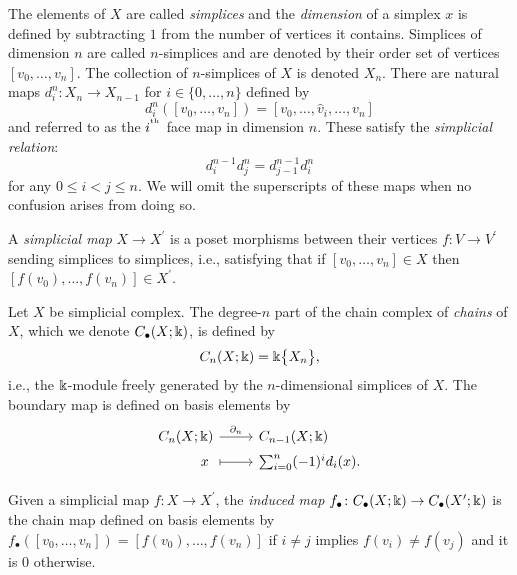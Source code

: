 The elements of $X$ are called \textit{simplices} and the \textit{dimension} of a simplex $x$ is defined by subtracting $1$ from the number of vertices it contains.
Simplices of dimension $n$ are called $n$-simplices and are denoted by their order set of vertices $[v_0, \dots, v_n]$.
The collection of $n$-simplices of $X$ is denoted $X_n$.
There are natural maps $d_i^n \colon X_n \to X_{n-1}$ for $i \in \{0, \dots, n\}$ defined by
\begin{equation*}
d_i^n([v_0, \dots, v_n]) = [v_0, \dots, \widehat{v}_i, \dots, v_n]
\end{equation*}
and referred to as the $i^{^\mathrm{th}}$ face map in dimension $n$.
These satisfy the \textit{simplicial relation}:
\begin{equation} \label{e:simplicial relation}
d_i^{n-1} d^n_j = d_{j-1}^{n-1} d_i^n
\end{equation}
for any $0 \leq i < j \leq n$.
We will omit the superscripts of these maps when no confusion arises from doing so.

A \textit{simplicial map} $X \to X^\prime$ is a poset morphisms between their vertices $f \colon V \to V^\prime$ sending simplices to simplices, i.e., satisfying that if $[v_0, \dots, v_n] \in X$ then $[f(v_0), \dots, f(v_n)] \in X^\prime$.

Let $X$ be simplicial complex.
The degree-$n$ part of the chain complex of \textit{chains} of $X$, which we denote $C_\bullet(X; \Bbbk)$, is defined by
\begin{equation*}
C_n(X; \Bbbk) = \Bbbk \big\{ X_n \big\},
\end{equation*}
i.e., the $\Bbbk$-module freely generated by the $n$-dimensional simplices of $X$.
The boundary map is defined on basis elements by
\begin{equation*}
\begin{tikzcd}[column sep=normal, row sep=tiny,row sep = 0ex
,/tikz/column 1/.append style={anchor=base east}
,/tikz/column 2/.append style={anchor=base west}
]
C_n(X; \k) \arrow[r, "\partial_n"] & C_{n-1}(X; \k) \\
x\ \arrow[r, |->] & \sum_{i=0}^{n} (-1)^i d_i (x).
\end{tikzcd}
\end{equation*}

Given a simplicial map $f \colon X \to X^\prime$, the \textit{induced map} $f_\bullet \colon C_\bullet(X; \Bbbk) \to C_\bullet(X^\prime; \Bbbk)$ is the chain map defined on basis elements by $f_\bullet([v_0, \dots, v_n]) = [f(v_0), \dots, f(v_n)]$ if $i \neq j$ implies $ f(v_i) \neq f(v_j)$ and it is $0$ otherwise.

